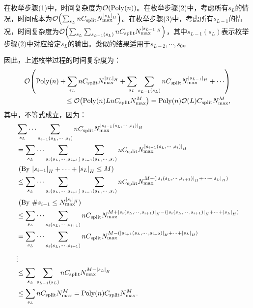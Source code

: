 在枚举步骤(1)中，时间复杂度为$\order{\mathrm{Poly}(n)}$。在枚举步骤(2)中，考虑所有$s_L$的情况，时间成本为$\order{\sum_{s_L}nC_{\text{split}} N_{\text{max}}^{\abs{s_L}_H}}$。在枚举步骤(3)中，考虑所有$s_{L-1}$的情况，时间复杂度为$\order{\sum_{s_L}\sum_{s_{L-1}(s_L)}nC_{\text{split}} N_{\text{max}}^{\abs{s_{L-1}}_H}}$，其中$s_{L-1}(s_L)$表示枚举步骤(2)中对应给定$s_L$的输出。类似的结果适用于$s_{L-2},\cdots,s_{0}$。

因此，上述枚举过程的时间复杂度为：
\begin{equation}
    \begin{aligned}
        \order{\mathrm{Poly}(n)+\sum_{s_L}nC_{\text{split}} N_{\text{max}}^{\abs{s_L}_H}+\sum_{s_L}\sum_{s_{L-1}(s_L)}nC_{\text{split}} N_{\text{max}}^{\abs{s_{L-1}}_H} + \cdots} \\
        \leq \order{\mathrm{Poly}(n)L nC_{\text{split}} N_{\text{max}}^{M}}=\mathrm{Poly}(n) \order{L} C_{\text{split}} N_{\text{max}}^{M},
    \end{aligned}
\end{equation}
其中，不等式成立，因为：
\begin{equation}
    \begin{aligned}
        &\sum_{s_L}\cdots\sum_{s_{i-1}(s_L,\cdots,s_i)}nC_{\text{split}} N_{\text{max}}^{\abs{s_{i-1}(s_L,\cdots,s_i)}_H} \\
        &=\sum_{s_L}\cdots\sum_{s_{i}(s_L,\cdots,s_{i+1})}\sum_{s_{i-1}(s_L,\cdots,s_i)}nC_{\text{split}} N_{\text{max}}^{\abs{s_{i-1}(s_L,\cdots,s_i)}_H}\\
        &\ (\mathrm{By} \ \abs{s_{i-1}}_H+\cdots +\abs{s_L}_H\leq M) \\
        &\leq \sum_{s_L}\cdots\sum_{s_{i}(s_L,\cdots,s_{i+1})}\sum_{s_{i-1}(s_L,\cdots,s_i)}nC_{\text{split}} N_{\text{max}}^{M-(\abs{s_{i}(s_L,\cdots,s_{i+1})}_H+\cdots+\abs{s_L}_H)}\\ 
        &\ (\mathrm{By} \ \#s_{i-1}\leq N_{\text{max}}^{\abs{s_i}_H}) \\
        &\leq \sum_{s_L}\cdots\sum_{s_{i}(s_L,\cdots,s_{i+1})}nC_{\text{split}} N_{\text{max}}^{M+\abs{s_{i}(s_L,\cdots,s_{i+1})}_H-(\abs{s_{i}(s_L,\cdots,s_{i+1})}_H+\cdots+\abs{s_L}_H)} \\
        &=\sum_{s_L}\cdots\sum_{s_{i}(s_L,\cdots,s_{i+1})}nC_{\text{split}} N_{\text{max}}^{M-(\abs{s_{i+1}(s_L,\cdots,s_{i+2})}_H+\cdots+\abs{s_L}_H)} \\
        &\vdots \\
        &\leq \sum_{s_L}\sum_{s_{L-1}(s_L)} nC_{\text{split}} N_{\text{max}}^{M-\abs{s_L}_H} \\
        &\leq \sum_{s_L} nC_{\text{split}} N_{\text{max}}^M=\mathrm{Poly}(n) C_{\text{split}} N_{\text{max}}^M.
    \end{aligned}
\end{equation}


